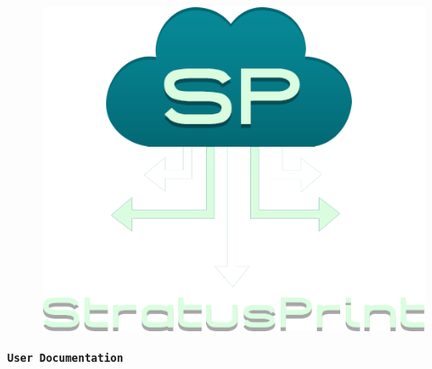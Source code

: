 \begin{titlepage}
\vspace*{\fill}
\pagecolor{titlepagecolor}
\color{white}

\begin{center}
\begin{figure}[!h]
   \centerline{\includegraphics[scale=0.6]{images/sp-logo-transparent}}
\end{figure}
\end{center}
\begin{center}

	\vspace{1.8em}

	\Huge\textbf{\texttt{User Documentation}} \textcolor{titlepagecolor!20}{\textsf{}}
\end{center}

\vspace*{\fill}
\end{titlepage}